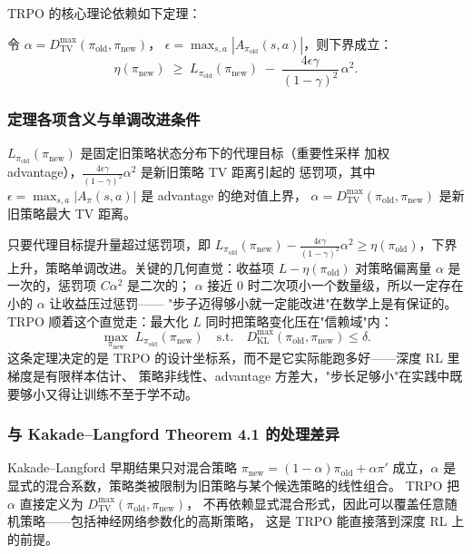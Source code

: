 \documentclass[12pt]{article}
\begin{document}
TRPO 的核心理论依赖如下定理：

\begin{theorembox}
令 $\alpha = D_{\mathrm{TV}}^{\max}(\pi_{\mathrm{old}}, \pi_{\mathrm{new}})$，
$\epsilon = \max_{s,a}|A_{\pi_{\mathrm{old}}}(s,a)|$，则下界成立：
\[
    \eta(\pi_{\mathrm{new}}) \;\geq\;
    L_{\pi_{\mathrm{old}}}(\pi_{\mathrm{new}}) \;-\;
    \frac{4\epsilon\gamma}{(1-\gamma)^2}\,\alpha^2.
\]
\end{theorembox}

\subsubsection{定理各项含义与单调改进条件}

$L_{\pi_{\mathrm{old}}}(\pi_{\mathrm{new}})$ 是固定旧策略状态分布下的代理目标（重要性采样
加权 advantage），$\frac{4\epsilon\gamma}{(1-\gamma)^2}\alpha^2$ 是新旧策略 TV 距离引起的
惩罚项，其中 $\epsilon=\max_{s,a}|A_\pi(s,a)|$ 是 advantage 的绝对值上界，
$\alpha=D_\mathrm{TV}^{\max}(\pi_\mathrm{old},\pi_\mathrm{new})$ 是新旧策略最大 TV 距离。

只要代理目标提升量超过惩罚项，即
$L_{\pi_{\mathrm{old}}}(\pi_{\mathrm{new}}) - \frac{4\epsilon\gamma}{(1-\gamma)^2}\alpha^2
\geq \eta(\pi_{\mathrm{old}})$，下界上升，策略单调改进。关键的几何直觉：收益项
$L-\eta(\pi_{\mathrm{old}})$ 对策略偏离量 $\alpha$ 是一次的，惩罚项 $C\alpha^2$ 是二次的；
$\alpha$ 接近 $0$ 时二次项小一个数量级，所以一定存在小的 $\alpha$ 让收益压过惩罚——
"步子迈得够小就一定能改进"在数学上是有保证的。TRPO 顺着这个直觉走：最大化 $L$
同时把策略变化压在"信赖域"内：
\[
    \max_{\pi_{\mathrm{new}}}\; L_{\pi_{\mathrm{old}}}(\pi_{\mathrm{new}})
    \quad \text{s.t.} \quad
    D_{\mathrm{KL}}^{\max}(\pi_{\mathrm{old}}, \pi_{\mathrm{new}}) \leq \delta.
\]
这条定理决定的是 TRPO 的设计坐标系，而不是它实际能跑多好——深度 RL 里梯度是有限样本估计、
策略非线性、advantage 方差大，"步长足够小"在实践中既要够小又得让训练不至于学不动。

\subsubsection{与 Kakade--Langford Theorem 4.1 的处理差异}

Kakade--Langford 早期结果只对混合策略 $\pi_\mathrm{new}=(1-\alpha)\pi_\mathrm{old}+\alpha\pi'$
成立，$\alpha$ 是显式的混合系数，策略类被限制为旧策略与某个候选策略的线性组合。
TRPO 把 $\alpha$ 直接定义为 $D_\mathrm{TV}^{\max}(\pi_\mathrm{old},\pi_\mathrm{new})$，
不再依赖显式混合形式，因此可以覆盖任意随机策略——包括神经网络参数化的高斯策略，
这是 TRPO 能直接落到深度 RL 上的前提。
\end{document}

